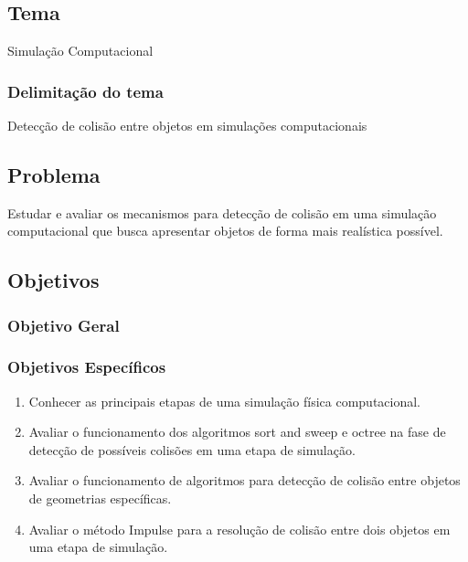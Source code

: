 \chapter*[]{}

\section{Tema}

Simulação Computacional

\subsection{Delimitação do tema}

Detecção de colisão entre objetos em simulações computacionais

\section{Problema}

 Estudar e avaliar os mecanismos para detecção de colisão em uma simulação computacional que busca apresentar objetos de forma mais realística possível.


\section{Objetivos}

\subsection{Objetivo Geral}

\subsection{Objetivos Específicos}
\begin{enumerate}
\item Conhecer as principais etapas de uma simulação física computacional.
\item Avaliar o funcionamento dos algoritmos sort and sweep e octree na fase de detecção de possíveis colisões em uma etapa de simulação.
\item Avaliar o funcionamento de algoritmos para detecção de colisão entre objetos de geometrias específicas.
\item Avaliar o método Impulse para a resolução de colisão entre dois objetos em uma etapa de simulação.
\end{enumerate}

